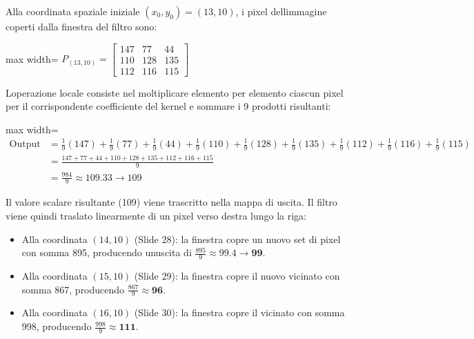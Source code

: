 \documentclass[11pt,a4paper,oneside,openany]{book}
\providecommand{\tightlist}{\setlength{\itemsep}{0pt}\setlength{\parskip}{0pt}}
\begin{document}
Alla coordinata spaziale iniziale \((x_0, y_0) = (13, 10)\), i pixel dell\textquotesingle immagine coperti dalla finestra del filtro sono:

\begin{center}
\begin{adjustbox}{max width=\linewidth}
$\displaystyle 
P_{(13, 10)} = \begin{bmatrix}
147 & 77 & 44 \\
110 & 128 & 135 \\
112 & 116 & 115
\end{bmatrix}
$
\end{adjustbox}
\end{center}

L\textquotesingle operazione locale consiste nel moltiplicare elemento per elemento ciascun pixel per il corrispondente coefficiente del kernel e sommare i 9 prodotti risultanti:

\begin{center}
\begin{adjustbox}{max width=\linewidth}
$\displaystyle 
\begin{aligned}
\text{Output} &= \frac{1}{9}(147) + \frac{1}{9}(77) + \frac{1}{9}(44) + \frac{1}{9}(110) + \frac{1}{9}(128) + \frac{1}{9}(135) + \frac{1}{9}(112) + \frac{1}{9}(116) + \frac{1}{9}(115) \\
&= \frac{147 + 77 + 44 + 110 + 128 + 135 + 112 + 116 + 115}{9} \\
&= \frac{984}{9} \approx 109.33 \longrightarrow 109
\end{aligned}
$
\end{adjustbox}
\end{center}

Il valore scalare risultante (109) viene trascritto nella mappa di uscita. Il filtro viene quindi traslato linearmente di un pixel verso destra lungo la riga:

\begin{itemize}
\tightlist
\item
  Alla coordinata \((14, 10)\) (Slide 28): la finestra copre un nuovo set di pixel con somma 895, producendo un\textquotesingle uscita di \(\frac{895}{9} \approx 99.4 \to \mathbf{99}\).
\item
  Alla coordinata \((15, 10)\) (Slide 29): la finestra copre il nuovo vicinato con somma 867, producendo \(\frac{867}{9} \approx \mathbf{96}\).
\item
  Alla coordinata \((16, 10)\) (Slide 30): la finestra copre il vicinato con somma 998, producendo \(\frac{998}{9} \approx \mathbf{111}\).
\end{itemize}
\end{document}
